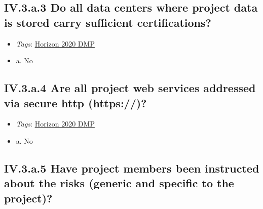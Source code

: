 \documentclass[a4paper,12pt]{report}
\begin{document}
\subsection*{\protect\textcolor{colorSecId}{IV.3.a.3} Do all data centers where project data is stored carry sufficient certifications?}

\label{10a10ffd-bfe1-4c6b-bbb6-3dfb1e63a5d5.614ab69d-55a6-4214-b384-00ba21ce92a1.b2f76c0a-847a-403c-9ed6-09cad10e625e.a454fffd-f4a4-426d-b758-6d70bc4ee96b}


\begin{itemize}
  \item \textit{Tags}: \ul{Horizon 2020 DMP}
  \end{itemize}




\begin{itemize}
  \item[\CheckmarkBold] a. No
\end{itemize}




\subsection*{\protect\textcolor{colorSecId}{IV.3.a.4} Are all project web services addressed via secure http (https://)?}

\label{10a10ffd-bfe1-4c6b-bbb6-3dfb1e63a5d5.614ab69d-55a6-4214-b384-00ba21ce92a1.b2f76c0a-847a-403c-9ed6-09cad10e625e.39d8dad9-7666-405c-b35c-9e430c9691ed}


\begin{itemize}
  \item \textit{Tags}: \ul{Horizon 2020 DMP}
  \end{itemize}




\begin{itemize}
  \item[\CheckmarkBold] a. No
\end{itemize}




\subsection*{\protect\textcolor{colorSecId}{IV.3.a.5} Have project members been instructed about the risks (generic and specific to the project)?}
\end{document}
